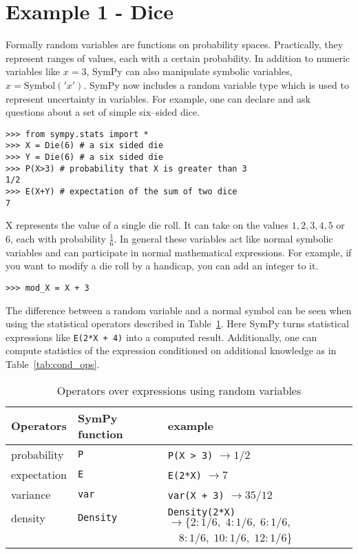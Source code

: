 \section{Example 1 - Dice}

Formally random variables are functions on probability spaces.  Practically,
they represent ranges of values, each with a certain probability.  In addition
to numeric variables like $x = 3$, SymPy can also manipulate symbolic
variables, $x = \text{Symbol}('x')$. SymPy now includes a random variable type
which is used to represent uncertainty in variables.  For example, one can
declare and ask questions about a set of simple six--sided dice.

\begin{lstlisting}
>>> from sympy.stats import *
>>> X = Die(6) # a six sided die
>>> Y = Die(6) # a six sided die
>>> P(X>3) # probability that X is greater than 3
1/2
>>> E(X+Y) # expectation of the sum of two dice
7
\end{lstlisting}

X represents the value of a single die roll. It can take on the values
$1,2,3,4,5$ or $6$, each with probability $\frac{1}{6}$. In general these
variables act like normal symbolic variables and can participate in normal
mathematical expressions. For example, if you want to modify a die roll by a
handicap, you can add an integer to it.

\begin{lstlisting}
>>> mod_X = X + 3
\end{lstlisting}

The difference between a random variable and a normal symbol can be seen when
using the statistical operators described in Table~\ref{tab:stat_ops}.  Here
SymPy turns statistical expressions like {\tt E(2*X + 4)} into a computed
result. Additionally, one can compute statistics of the expression conditioned
on additional knowledge as in Table~\ref{tab:cond_ops}.

\begin{table}[h]
\begin{tabular}{|lll|}
\hline
Operators & SymPy function & example\\ \hline
probability & {\tt P} & {\tt P(X > 3)}  $\rightarrow 1/2$\\ \hline
expectation & {\tt E} & {\tt E(2*X)} $\rightarrow 7$ \\ \hline
variance & {\tt var} & {\tt var(X + 3)} $\rightarrow 35/12$\\ \hline
density & {\tt Density} & {\tt Density(2*X)}  $\rightarrow \{2: 1/6,\; 4: 1/6,\; 6: 1/6,$ \\
            & & \phantom{Density(X+3) $\rightarrow$} $\quad 8: 1/6,\; 10: 1/6,\; 12: 1/6\}$ \\ \hline
\end{tabular}
\label{tab:stat_ops}
\caption{Operators over expressions using random variables}
\end{table}

